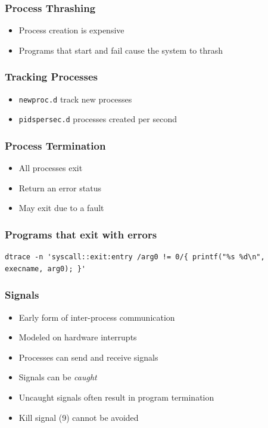 \documentclass[pdftex]{beamer}
\begin{document}
\begin{frame}
  \frametitle{Process Thrashing}
  \begin{itemize}
  \item Process creation is expensive
  \item Programs that start and fail cause the system to thrash
  \end{itemize}
\end{frame}

\begin{frame}[fragile]
  \frametitle{Tracking Processes}
  \begin{itemize}
  \item \verb+newproc.d+ track new processes
  \item \verb+pidspersec.d+ processes created per second
  \end{itemize}
\end{frame}

\begin{frame}
  \frametitle{Process Termination}
  \begin{itemize}
  \item All processes exit
  \item Return an error status
  \item May exit due to a fault
  \end{itemize}
\end{frame}

\begin{frame}[fragile]
  \frametitle{Programs that exit with errors}
\begin{lstlisting}
dtrace -n 'syscall::exit:entry /arg0 != 0/{ printf("%s %d\n", execname, arg0); }'
\end{lstlisting}
\end{frame}

\begin{frame}
  \frametitle{Signals}
  \begin{itemize}
  \item Early form of inter-process communication
  \item Modeled on hardware interrupts
  \item Processes can send and receive signals
  \item Signals can be \emph{caught}
  \item Uncaught signals often result in program termination
  \item Kill signal (9) cannot be avoided
  \end{itemize}
\end{frame}
\end{document}
